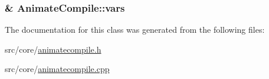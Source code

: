 \hypertarget{a00007_a5bb5e56e9ad574dc86439a37eb4511c7}{
\subsubsection[{vars}]{\& Animate\-Compile\-::vars\hspace{0.3cm}{\ttfamily [private]}}}\label{a00007_a5bb5e56e9ad574dc86439a37eb4511c7}


The documentation for this class was generated from the following files\-:\begin{DoxyCompactItemize}
\item 
src/core/\hyperlink{a00200}{animatecompile.\-h}\item 
src/core/\hyperlink{a00199}{animatecompile.\-cpp}\end{DoxyCompactItemize}
